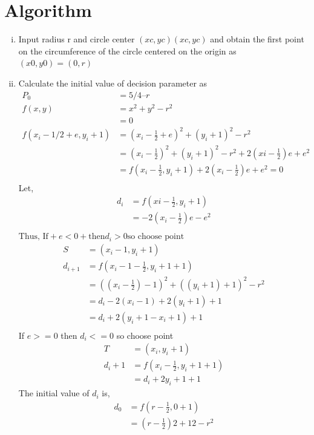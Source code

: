 \documentclass[11pt]{report}
\begin{document}
\section{Algorithm}
\begin{enumerate}[(i)]
	\item Input radius r and circle center $(xc,yc)(xc,yc)$ and obtain the first point on the circumference of the circle centered on the origin as $(x0, y0) = (0, r)$
	\item Calculate the initial value of decision parameter as
	\begin{align*}	
	P_0 &= 5/4 – r\\
	f(x, y) &= x^2 + y^2 - r^2\\ &= 0\\
	f(x_i - 1/2 + e, y_i + 1)
	&= (x_i - \frac{1}{2} + e)^2 + (y_i + 1)^2 - r^2 \\
	&= (x_i- \frac{1}{2})^2 + (y_i + 1)^2 - r^2 + 2(xi - \frac{1}{2})e + e^2\\
	&= f(x_i - \frac{1}{2}, y_i + 1) + 2(x_i - \frac{1}{2})e + e^2 = 0\\
	\end{align*}
	Let,
	\begin{align*}
	d_i &= f(xi - \frac{1}{2}, y_i + 1) \\
	&= -2(x_i - \frac{1}{2})e - e^2 \\
	\end{align*}
	$\text{Thus, If}+ e < 0 +\text{then} d_i > 0 \text{so choose point}$
	\begin{align*}
	S &= (x_i - 1, y_i + 1)\\
	d_{i+1}    &= f(x_i - 1 - \frac{1}{2}, y_i + 1 + 1) \\
	&= ((x_i - \frac{1}{2}) - 1)^2 + ((y_i + 1) + 1)^2 - r^2\\
	&= d_i - 2(x_i - 1) + 2(y_i + 1) + 1\\
	&= d_i + 2(y_i + 1 - x_i + 1) + 1\\
	\end{align*}
	If $e >= 0$ then $d_i <= 0$ so choose point 
	\begin{align*}
	T &= (x_i, y_i + 1)\\
	d_i+1 &= f(x_i - \frac{1}{2}, y_i + 1 + 1)\\
	&= d_i + 2y_i+1 + 1
	\end{align*}	
	The initial value of $d_i$ is,
	\begin{align*}
	d_0 &= f(r - \frac{1}{2}, 0 + 1) \\
	&= (r - \frac{1}{2})2 + 12 - r^2\\

\end{align*}
\end{enumerate}
\end{document}
